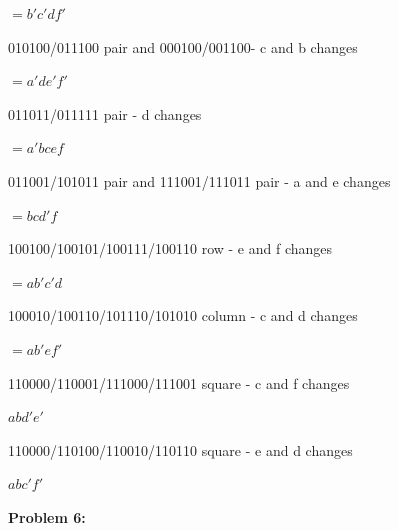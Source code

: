 \documentclass{article}
\begin{document}
    \quad\quad $=b'c'df'$

    010100/011100 pair and 000100/001100- c and b changes

    \quad\quad $=a'de'f'$

    011011/011111 pair - d changes

    \quad\quad $=a'bcef$

    011001/101011 pair and 111001/111011 pair - a and e changes

    \quad\quad $=bcd'f$

    100100/100101/100111/100110 row - e and f changes

    \quad\quad $=ab'c'd$

    100010/100110/101110/101010 column - c and d changes

    \quad\quad $=ab'ef'$

    110000/110001/111000/111001 square - c and f changes

    \quad\quad $abd'e'$

    110000/110100/110010/110110 square - e and d changes

    \quad\quad $abc'f'$



    \textbf{Problem 6:}
\end{document}
